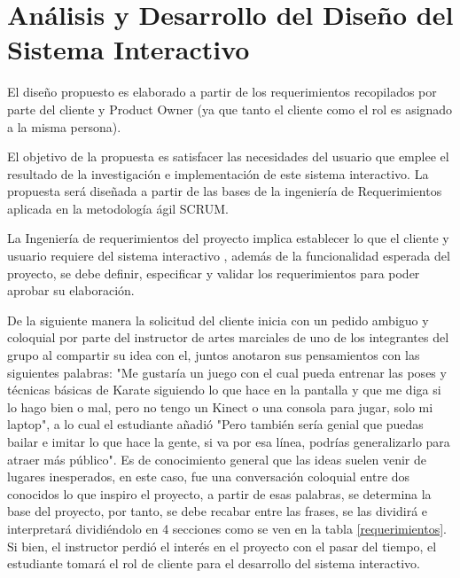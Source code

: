 \chapter{Análisis y Desarrollo del Diseño del Sistema Interactivo}

El diseño propuesto es elaborado a partir de los requerimientos recopilados por parte del cliente y Product Owner (ya que tanto el cliente como el rol es asignado a la misma persona).

El objetivo de la propuesta es satisfacer las necesidades del usuario que emplee el resultado de la investigación e implementación de este sistema interactivo. La propuesta será diseñada a partir de las bases de la ingeniería de Requerimientos aplicada en la metodología ágil SCRUM.

La Ingeniería de requerimientos del proyecto implica establecer lo que el cliente y usuario requiere del sistema interactivo \cite{scrumdiapo}, además de la funcionalidad esperada del proyecto, se debe definir, especificar y validar los requerimientos para poder aprobar su elaboración.

De la siguiente manera la solicitud del cliente inicia con un pedido ambiguo y coloquial por parte del instructor de artes marciales de uno de los integrantes del grupo al compartir su idea con el, juntos anotaron sus pensamientos con las siguientes palabras: "Me gustaría un juego con el cual pueda entrenar las poses y técnicas básicas de Karate siguiendo lo que hace en la pantalla y que me diga si lo hago bien o mal, pero no tengo un Kinect o una consola para jugar, solo mi laptop", a lo cual el estudiante añadió "Pero también sería genial que puedas bailar e imitar lo que hace la gente, si va por esa línea, podrías generalizarlo para atraer más público". Es de conocimiento general que las ideas suelen venir de lugares inesperados, en este caso, fue una conversación coloquial entre dos conocidos lo que inspiro el proyecto, a partir de esas palabras, se determina la base del proyecto, por tanto, se debe recabar entre las frases, se las dividirá e interpretará dividiéndolo en 4 secciones como se ven en la tabla \ref{requerimientos}. Si bien, el instructor perdió el interés en el proyecto con el pasar del tiempo, el estudiante tomará el rol de cliente para el desarrollo del sistema interactivo.


